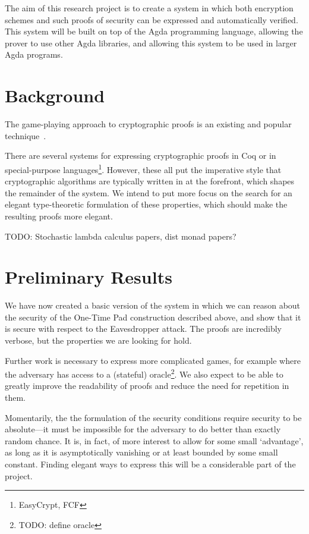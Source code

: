 \documentclass{article}
\begin{document}
    The aim of this research project is to create a system in which both encryption schemes and such proofs of security
    can be expressed and automatically verified.  This system will be built on top of the Agda programming language,
    allowing the prover to use other Agda libraries, and allowing this system to be used in larger Agda programs.

    \section{Background}

    The game-playing approach to cryptographic proofs is an existing and popular technique~\cite{codebasedgames}.

    There are several systems for expressing cryptographic proofs in Coq or in special-purpose
    languages\footnote{EasyCrypt, FCF}.  However, these all put the imperative style that cryptographic algorithms are
    typically written in at the forefront, which shapes the remainder of the system.  We intend to put more focus on the
    search for an elegant type-theoretic formulation of these properties, which should make the resulting proofs more
    elegant.

    TODO: Stochastic lambda calculus papers, dist monad papers?

    \section{Preliminary Results}

    We have now created a basic version of the system in which we can reason about the security of the One-Time Pad
    construction described above, and show that it is secure with respect to the Eavesdropper attack.  The proofs are
    incredibly verbose, but the properties we are looking for hold.  

    Further work is necessary to express more complicated games, for example where the adversary has access to a
    (stateful) oracle\footnote{TODO: define oracle}.  We also expect to be able to greatly improve the readability of
    proofs and reduce the need for repetition in them.

    Momentarily, the the formulation of the security conditions require security to be absolute---it must be impossible
    for the adversary to do better than exactly random chance.  It is, in fact, of more interest to allow for some small
    `advantage', as long as it is asymptotically vanishing or at least bounded by some small constant.  Finding elegant
    ways to express this will be a considerable part of the project.
\end{document}
